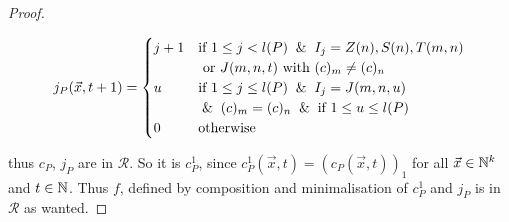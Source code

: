\begin{theorem}
\begin{proof}
\begin{itemize}
      \[
        j_P(\vec{x}, t+1) = \begin{cases}
          j + 1       & \text{if } 1 \leq j < l(P) \And I_j = Z(n), S(n), T(m,n) \\
                      & \text{ or } J(m,n,t) \text{ with } (c)_m \neq (c)_n \\
          u           & \text{if } 1 \leq j \leq l(P) \And I_{j} = J(m,n,u) \\
                      & \And (c)_m = (c)_n \And \text{if } 1 \leq u \leq l(P) \\
          0 & \text{otherwise}
        \end{cases}
      \]
    \end{itemize}
    thus $c_P$, $j_P$ are in $\mathcal{R}$.
    So it is $c_P^1$, since $c_P^1(\vec{x}, t) = (c_P(\vec{x}, t))_1$ for all $\vec{x}\in\mathbb{N}^k$ and $t\in\mathbb{N}$.
    Thus $f$, defined by composition and minimalisation of $c_P^1$ and $j_P$ is in $\mathcal{R}$ as wanted.

  \end{proof}
\end{theorem}
